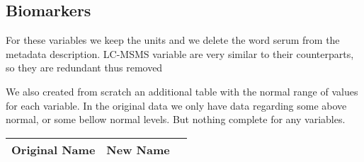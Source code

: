 \subsection{Biomarkers}

For these variables we keep the units and we delete the word serum from the metadata description. LC-MSMS variable are very similar to their counterparts, so they are redundant thus removed\vspace{3 mm}

We also created from scratch an additional table with the normal range of values for each variable. In the original data we only have data regarding some above normal, or some bellow normal levels. But nothing complete for any variables.\vspace{3 mm}


\begin{table}[H]
    \centering

    \label{table:Biomarkers_info_new_names}
    
	\renewcommand{\arraystretch}{1.5}

    \begin{tabular}{| l | p{10cm}  l }
        \hline
        \rowcolor[HTML]{FFAAAA}

        \textbf{Original Name} & \textbf{New Name} \\
        \hline 


\end{tabular}
\end{table}
